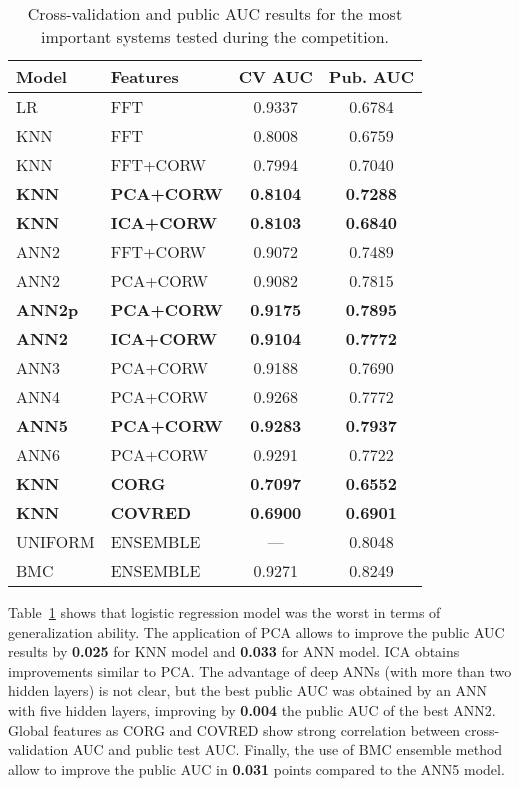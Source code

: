 \documentclass[a4paper,english,twoside]{article}
\begin{document}
\begin{table}
  \centering
  \begin{tabular}{|l|l|cc|}
    \hline
    Model & Features & CV AUC & Pub. AUC\\
    \hline
    \hline
    LR & FFT & 0.9337 & 0.6784\\
    \hline
    KNN & FFT & 0.8008 & 0.6759\\
    KNN & FFT+CORW & 0.7994 & 0.7040\\
    \textbf{KNN} & \textbf{PCA+CORW} & \textbf{0.8104} & \textbf{0.7288}\\
    \textbf{KNN} & \textbf{ICA+CORW} & \textbf{0.8103} & \textbf{0.6840}\\
    \hline
    ANN2 & FFT+CORW & 0.9072 & 0.7489\\
    ANN2 & PCA+CORW & 0.9082 & 0.7815\\
    \textbf{ANN2p} & \textbf{PCA+CORW} & \textbf{0.9175} & \textbf{0.7895}\\
    \textbf{ANN2} & \textbf{ICA+CORW} & \textbf{0.9104} & \textbf{0.7772}\\
    ANN3 & PCA+CORW & 0.9188 & 0.7690\\
    ANN4 & PCA+CORW & 0.9268 & 0.7772\\
    \textbf{ANN5} & \textbf{PCA+CORW} & \textbf{0.9283} & \textbf{0.7937}\\
    ANN6 & PCA+CORW & 0.9291 & 0.7722\\
    \hline
    \textbf{KNN} & \textbf{CORG} & \textbf{0.7097} & \textbf{0.6552}\\
    \textbf{KNN} & \textbf{COVRED} & \textbf{0.6900} & \textbf{0.6901}\\
    \hline
    UNIFORM & ENSEMBLE & --- & 0.8048\\
    BMC & ENSEMBLE & 0.9271 & 0.8249\\
    \hline
  \end{tabular}
  \caption{Cross-validation and public AUC results for the most important
    systems tested during the competition.\label{tab:val}}
\end{table}            

Table~\ref{tab:val} shows that logistic regression model was the worst in
terms of generalization ability. The application of PCA allows to
improve the public AUC results by \textbf{0.025} for KNN model and
\textbf{0.033} for ANN model. ICA obtains improvements similar to PCA.
The advantage of deep ANNs (with more than two hidden layers) is not
clear, but the best public AUC was obtained by an ANN with five hidden
layers, improving by \textbf{0.004} the public AUC of the best ANN2.
Global features as CORG and COVRED show strong correlation between
cross-validation AUC and public test AUC. Finally, the use of BMC
ensemble method allow to improve the public AUC in \textbf{0.031} points
compared to the ANN5 model.
\end{document}
